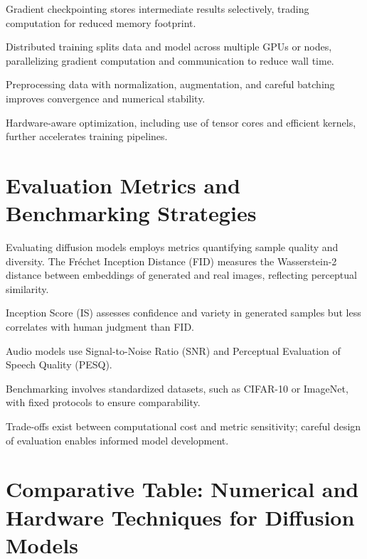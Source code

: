 Gradient checkpointing stores intermediate results selectively, trading computation for reduced memory footprint.

Distributed training splits data and model across multiple GPUs or nodes, parallelizing gradient computation and communication to reduce wall time.

Preprocessing data with normalization, augmentation, and careful batching improves convergence and numerical stability.

Hardware-aware optimization, including use of tensor cores and efficient kernels, further accelerates training pipelines.

\section{Evaluation Metrics and Benchmarking Strategies}

Evaluating diffusion models employs metrics quantifying sample quality and diversity. The Fréchet Inception Distance (FID) measures the Wasserstein-2 distance between embeddings of generated and real images, reflecting perceptual similarity.

Inception Score (IS) assesses confidence and variety in generated samples but less correlates with human judgment than FID.

Audio models use Signal-to-Noise Ratio (SNR) and Perceptual Evaluation of Speech Quality (PESQ).

Benchmarking involves standardized datasets, such as CIFAR-10 or ImageNet, with fixed protocols to ensure comparability.

Trade-offs exist between computational cost and metric sensitivity; careful design of evaluation enables informed model development.

\section{Comparative Table: Numerical and Hardware Techniques for Diffusion Models}

\begin{table}[h]
\centering
{}
\caption{Numerical and Hardware Optimization Techniques}
\end{table}

